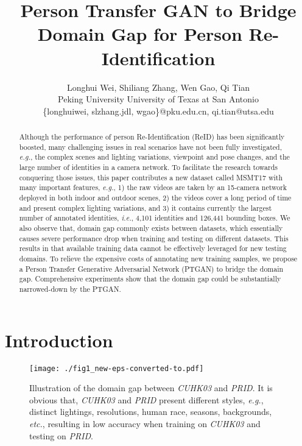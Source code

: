 \documentclass[10pt,twocolumn,letterpaper]{article}
\begin{document}
\title{Person Transfer GAN to Bridge Domain Gap for Person Re-Identification}

\author{Longhui Wei, Shiliang Zhang, Wen Gao, Qi Tian\\
\normalsize{Peking University}       \quad \normalsize{University of Texas at San Antonio}\\
\small{\{longhuiwei, slzhang.jdl, wgao\}@pku.edu.cn, qi.tian@utsa.edu}
}



\maketitle


\begin{abstract}
Although the performance of person Re-Identification (ReID) has been significantly boosted, many challenging issues in real scenarios have not been fully investigated, \emph{e.g.}, the complex scenes and lighting variations, viewpoint and pose changes, and the large number of identities in a camera network. To facilitate the research towards conquering those issues, this paper contributes a new dataset called MSMT17 with many important features, \emph{e.g.}, 1) the raw videos are taken by an 15-camera network deployed in both indoor and outdoor scenes, 2) the videos cover a long period of time and present complex lighting variations, and 3) it contains currently the largest number of annotated identities, \emph{i.e.}, 4,101 identities and 126,441 bounding boxes. We also observe that, domain gap commonly exists between datasets, which essentially causes severe performance drop when training and testing on different datasets. This results in that available training data cannot be effectively leveraged for new testing domains. To relieve the expensive costs of annotating new training samples, we propose a Person Transfer Generative Adversarial Network (PTGAN) to bridge the domain gap. Comprehensive experiments show that the domain gap could be substantially narrowed-down by the PTGAN.
\end{abstract}

\section{Introduction}

\begin{figure}
\begin{center}
\texttt{[image: ./fig1\_new-eps-converted-to.pdf]}
\end{center}
  \vspace{-3mm}
\caption{Illustration of the domain gap between \emph{CUHK03} and \emph{PRID}. It is obvious that, \emph{CUHK03} and \emph{PRID} present different styles, \emph{e.g.}, distinct lightings, resolutions, human race, seasons, backgrounds, \emph{etc.}, resulting in low accuracy when training on \emph{CUHK03} and testing on \emph{PRID}.}
\label{fig:fig1}
\end{figure}
\end{document}
